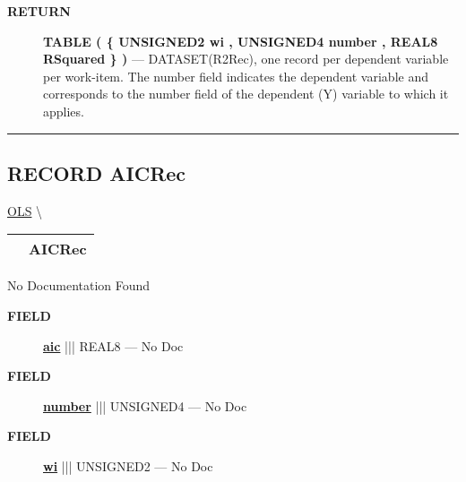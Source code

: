 \par
\begin{description}
\item [\colorbox{tagtype}{\color{white} \textbf{\textsf{RETURN}}}] \textbf{TABLE ( \{ UNSIGNED2 wi , UNSIGNED4 number , REAL8 RSquared \} )} --- DATASET(R2Rec), one record per dependent variable per work-item. The number field indicates the dependent variable and corresponds to the number field of the dependent (Y) variable to which it applies.
\end{description}




\rule{\linewidth}{0.5pt}
\subsection*{\textsf{\colorbox{headtoc}{\color{white} RECORD}
AICRec}}

\hypertarget{ecldoc:linearregression.ols.aicrec}{}
\hspace{0pt} \hyperlink{ecldoc:linearregression.ols}{OLS} \textbackslash 

{\renewcommand{\arraystretch}{1.5}
\begin{tabularx}{\textwidth}{|>{\raggedright\arraybackslash}l|X|}
\hline
\hspace{0pt}\mytexttt{\color{red} } & \textbf{AICRec} \\
\hline
\end{tabularx}
}

\par





No Documentation Found







\par
\begin{description}
\item [\colorbox{tagtype}{\color{white} \textbf{\textsf{FIELD}}}] \textbf{\underline{aic}} ||| REAL8 --- No Doc
\item [\colorbox{tagtype}{\color{white} \textbf{\textsf{FIELD}}}] \textbf{\underline{number}} ||| UNSIGNED4 --- No Doc
\item [\colorbox{tagtype}{\color{white} \textbf{\textsf{FIELD}}}] \textbf{\underline{wi}} ||| UNSIGNED2 --- No Doc
\end{description}






